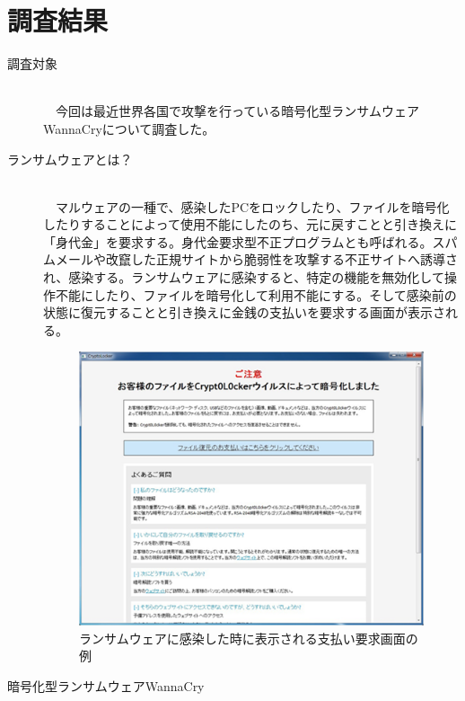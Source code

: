 \documentclass[a4paper,12pt]{jarticle}
\begin{document}
\section{調査結果}
\begin{description}
 \item[調査対象]\mbox\\\\
　今回は最近世界各国で攻撃を行っている暗号化型ランサムウェアWannaCryについて調査した。
 \item[ランサムウェアとは？]\mbox\\\\
　マルウェアの一種で、感染したPCをロックしたり、ファイルを暗号化したりすることによって使用不能にしたのち、元に戻すことと引き換えに「身代金」を要求する。身代金要求型不正プログラムとも呼ばれる。スパムメールや改竄した正規サイトから脆弱性を攻撃する不正サイトへ誘導され、感染する。ランサムウェアに感染すると、特定の機能を無効化して操作不能にしたり、ファイルを暗号化して利用不能にする。そして感染前の状態に復元することと引き換えに金銭の支払いを要求する画面が表示される。
  \begin{figure}[H]
   \begin{center}
    \includegraphics[width=100truemm]{Ransomware.png}
    \caption{ランサムウェアに感染した時に表示される支払い要求画面の例}
    \label{RansomwarePicture}
   \end{center}
  \end{figure}
 \item[暗号化型ランサムウェアWannaCry]\mbox\\\\

\end{description}
\end{document}
